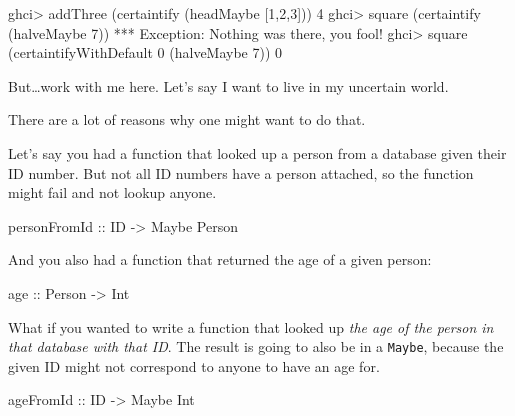 \documentclass[]{article}
\newenvironment{Shaded}{}{}
\newcommand{\DataTypeTok}[1]{\textcolor[rgb]{0.56,0.13,0.00}{#1}}
\newcommand{\DecValTok}[1]{\textcolor[rgb]{0.25,0.63,0.44}{#1}}
\newcommand{\NormalTok}[1]{#1}
\newcommand{\OperatorTok}[1]{\textcolor[rgb]{0.40,0.40,0.40}{#1}}
\newcommand{\OtherTok}[1]{\textcolor[rgb]{0.00,0.44,0.13}{#1}}
\begin{document}
\begin{Shaded}
\begin{Highlighting}[]
\NormalTok{ghci}\OperatorTok{\textgreater{}}\NormalTok{ addThree (certaintify (headMaybe [}\DecValTok{1}\NormalTok{,}\DecValTok{2}\NormalTok{,}\DecValTok{3}\NormalTok{]))}
\DecValTok{4}
\NormalTok{ghci}\OperatorTok{\textgreater{}}\NormalTok{ square (certaintify (halveMaybe }\DecValTok{7}\NormalTok{))}
\OperatorTok{***} \DataTypeTok{Exception}\OperatorTok{:} \DataTypeTok{Nothing}\NormalTok{ was there, you fool}\OperatorTok{!}
\NormalTok{ghci}\OperatorTok{\textgreater{}}\NormalTok{ square (certaintifyWithDefault }\DecValTok{0}\NormalTok{ (halveMaybe }\DecValTok{7}\NormalTok{))}
\DecValTok{0}
\end{Highlighting}
\end{Shaded}

But\ldots work with me here. Let's say I want to live in my uncertain world.

There are a lot of reasons why one might want to do that.

Let's say you had a function that looked up a person from a database given their
ID number. But not all ID numbers have a person attached, so the function might
fail and not lookup anyone.

\begin{Shaded}
\begin{Highlighting}[]
\OtherTok{personFromId ::} \DataTypeTok{ID} \OtherTok{{-}\textgreater{}} \DataTypeTok{Maybe} \DataTypeTok{Person}
\end{Highlighting}
\end{Shaded}

And you also had a function that returned the age of a given person:

\begin{Shaded}
\begin{Highlighting}[]
\OtherTok{age ::} \DataTypeTok{Person} \OtherTok{{-}\textgreater{}} \DataTypeTok{Int}
\end{Highlighting}
\end{Shaded}

What if you wanted to write a function that looked up \emph{the age of the
person in that database with that ID}. The result is going to also be in a
\texttt{Maybe}, because the given ID might not correspond to anyone to have an
age for.

\begin{Shaded}
\begin{Highlighting}[]
\OtherTok{ageFromId ::} \DataTypeTok{ID} \OtherTok{{-}\textgreater{}} \DataTypeTok{Maybe} \DataTypeTok{Int}
\end{Highlighting}
\end{Shaded}
\end{document}
